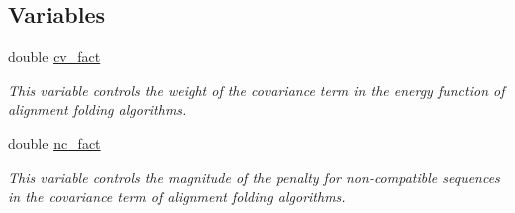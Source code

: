 \subsection*{Variables}
\begin{DoxyCompactItemize}
\item 
double \hyperlink{group__consensus__fold_gaf3cbac6ff5d706d6e414677841ddf94c}{cv\+\_\+fact}
\begin{DoxyCompactList}\small\item\em This variable controls the weight of the covariance term in the energy function of alignment folding algorithms. \end{DoxyCompactList}\item 
double \hyperlink{group__consensus__fold_ga502948a122a2af5b914355b1f3ea2f61}{nc\+\_\+fact}
\begin{DoxyCompactList}\small\item\em This variable controls the magnitude of the penalty for non-\/compatible sequences in the covariance term of alignment folding algorithms. \end{DoxyCompactList}\end{DoxyCompactItemize}
